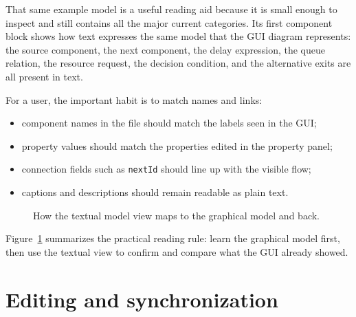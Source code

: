 That same example model is a useful reading aid because it is small enough to
inspect and still contains all the major current categories. Its first
component block shows how text expresses the same model that the GUI diagram
represents: the source component, the next component, the delay expression,
the queue relation, the resource request, the decision condition, and the
alternative exits are all present in text.

For a user, the important habit is to match names and links:
\begin{itemize}
\item component names in the file should match the labels seen in the GUI;
\item property values should match the properties edited in the property panel;
\item connection fields such as \texttt{nextId} should line up with the visible flow;
\item captions and descriptions should remain readable as plain text.
\end{itemize}

\begin{figure}[htbp]
\centering
\caption{How the textual model view maps to the graphical model and back.}
\label{fig:model-language-flow}
\end{figure}

Figure~\ref{fig:model-language-flow} summarizes the practical reading rule:
learn the graphical model first, then use the textual view to confirm and
compare what the GUI already showed.

\section{Editing and synchronization}
\label{sec:model-language-editing}

